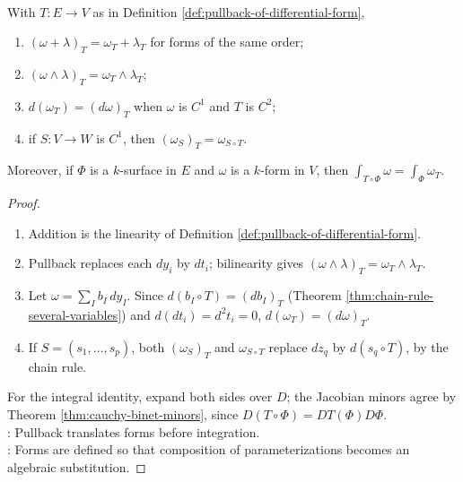 \begin{theorem} \label{thm:pullback-basic-laws} \\
With $T:E\to V$ as in Definition \ref{def:pullback-of-differential-form},
\begin{enumerate}[label=(\roman*)]
\setlength{\itemsep}{0pt}
\item $(\omega+\lambda)_T=\omega_T+\lambda_T$ for forms of the same order;
\item $(\omega\wedge\lambda)_T=\omega_T\wedge\lambda_T$;
\item $d(\omega_T)=(d\omega)_T$ when $\omega$ is $C^1$ and $T$ is $C^2$;
\item if $S:V\to W$ is $C^1$, then $(\omega_S)_T=\omega_{S\circ T}$.
\end{enumerate}
Moreover, if $\Phi$ is a $k$-surface in $E$ and $\omega$ is a $k$-form in $V$, then $\int_{T\circ\Phi}\omega=\int_{\Phi}\omega_T$.
\begin{proof}
\begin{enumerate}[label=(\roman*)]
\setlength{\itemsep}{0pt}
\item Addition is the linearity of Definition \ref{def:pullback-of-differential-form}.
\item Pullback replaces each $dy_i$ by $dt_i$; bilinearity gives $(\omega\wedge\lambda)_T=\omega_T\wedge\lambda_T$.
\item Let $\omega=\sum_I b_I\,dy_I$. Since $d(b_I\circ T)=(db_I)_T$ (Theorem \ref{thm:chain-rule-several-variables}) and $d(dt_i)=d^2t_i=0$, $d(\omega_T)=(d\omega)_T$.
\item If $S=(s_1,\ldots,s_p)$, both $(\omega_S)_T$ and $\omega_{S\circ T}$ replace $dz_q$ by $d(s_q\circ T)$, by the chain rule.
\end{enumerate}
For the integral identity, expand both sides over $D$; the Jacobian minors agree by Theorem \ref{thm:cauchy-binet-minors}, since $D(T\circ\Phi)=DT(\Phi)D\Phi$.\\
: Pullback translates forms before integration.\\
: Forms are defined so that composition of parameterizations becomes an algebraic substitution.
\end{proof}
\end{theorem}
